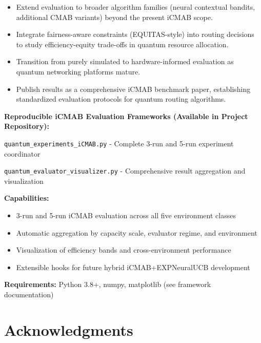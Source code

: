 \documentclass[12pt,a4paper]{article}
\begin{document}
\begin{itemize}
\item Extend evaluation to broader algorithm families (neural contextual bandits, additional CMAB variants) beyond the present iCMAB scope.
\item Integrate fairness-aware constraints (EQUITAS-style) into routing decisions to study efficiency-equity trade-offs in quantum resource allocation.
\item Transition from purely simulated to hardware-informed evaluation as quantum networking platforms mature.
\item Publish results as a comprehensive iCMAB benchmark paper, establishing standardized evaluation protocols for quantum routing algorithms.
\end{itemize}

\begin{tcolorbox}[colback=colabcolor!20,colframe=colabcolor,title=\textbf{Interactive Framework Access (Experimental Notebooks)}]

\begin{center}
\textbf{Reproducible iCMAB Evaluation Frameworks (Available in Project Repository):}
\vspace{0.3cm}

\texttt{quantum\_experiments\_iCMAB.py} - Complete 3-run and 5-run experiment coordinator

\texttt{quantum\_evaluator\_visualizer.py} - Comprehensive result aggregation and visualization

\vspace{0.3cm}
\textbf{Capabilities:}
\begin{itemize}
\item 3-run and 5-run iCMAB evaluation across all five environment classes
\item Automatic aggregation by capacity scale, evaluator regime, and environment
\item Visualization of efficiency bands and cross-environment performance
\item Extensible hooks for future hybrid iCMAB+EXPNeuralUCB development
\end{itemize}

\textbf{Requirements:} Python 3.8+, numpy, matplotlib (see framework documentation)
\end{center}
\end{tcolorbox}

\section{Acknowledgments}
\end{document}
